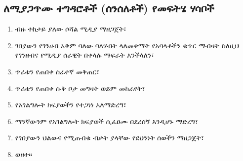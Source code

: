 \documentclass[a4paper,12pt]{article}
\newenvironment{geez}{\geezfont}{}
\begin{document}
\subsection{\begin{geez}ለሚያጋጥሙ ተግዳሮቶች (ሰንሰለቶች) የመፍትሄ ሃሳቦች\end{geez}}  
\begin{enumerate}
\item ብዙ ተከታይ ያለው ሶሻል ሚዲያ ማዘጋጀት፣
\item ገበያውን የገንዘብ አቅም ባለው ባለሃብት ላለመቀማት የአባላቶችን ቁጥር ማብዛት ስለዚህ የገንዘብና የሚዲያ ሰራዊት በቀላሉ ማፍራት እንችላለን፣
\item ጥራቱን የጠበቀ ሰራተኛ መቅጠር፣
\item ጥራቱን የጠበቀ ሱቅ ቦታ መግዛት ወይም መከራየት፣
\item የአገልግሎት ክፍያወችን የተጋነነ አለማድረግ፣
\item ማንኛውንም የአገልግሎት ክፍያወች ሲፈፀሙ በደረሰኝ እንዲሆኑ ማድረግ፣
\item የገበያውን ህልውና የሚጠብቁ ብቃት ያላቸው የደህንነት ሰወችን ማዘጋጀት፣
\item ወዘተ።
\end{enumerate}
\printbibliography
\end{document}
